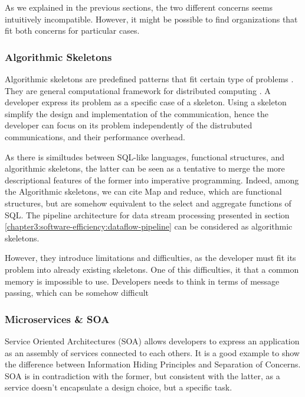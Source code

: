 As we explained in the previous sections, the two different concerns seems intuitively incompatible.
However, it might be possible to find organizations that fit both concerns for particular cases.

\subsubsection{Algorithmic Skeletons}

Algorithmic skeletons are predefined patterns that fit certain type of problems \cite{Cole1988}.
They are general computational framework for distributed computing \cite{Dean2008, McCool2010, Gonzalez-Velez2010}.
A developer express its problem as a specific case of a skeleton.
Using a skeleton simplify the design and implementation of the communication, hence the developer can focus on its problem independently of the distrubuted communications, and their performance overhead.

As there is similtudes between SQL-like languages, functional structures, and algorithmic skeletons, the latter can be seen as a tentative to merge the more descriptional features of the former into imperative programming.
Indeed, among the Algorithmic skeletons, we can cite Map and reduce, which are functional structures, but are somehow equivalent to the select and aggregate functions of SQL.
The pipeline architecture for data stream processing presented in section \ref{chapter3:software-efficiency:dataflow-pipeline} can be considered as algorithmic skeletons.

However, they introduce limitations and difficulties, as the developer must fit its problem into already existing skeletons.
One of this difficulties, it that a common memory is impossible to use.
Developers needs to think in terms of message passing, which can be somehow difficult 

\subsubsection{Microservices \& SOA}

Service Oriented Architectures (SOA) allows developers to express an application as an assembly of services connected to each others.
It is a good example to show the difference between Information Hiding Principles and Separation of Concerns.
SOA is in contradiction with the former, but consistent with the latter, as a service doesn't encapsulate a design choice, but a specific task.

